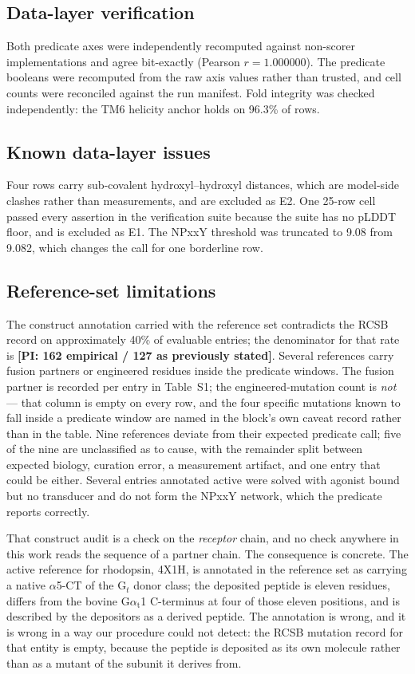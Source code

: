 \subsection*{Data-layer verification}

Both predicate axes were independently recomputed against non-scorer
implementations and agree bit-exactly (Pearson $r = 1.000000$). The predicate
booleans were recomputed from the raw axis values rather than trusted, and cell
counts were reconciled against the run manifest. Fold integrity was checked
independently: the TM6 helicity anchor holds on 96.3\% of rows.

\subsection*{Known data-layer issues}

Four rows carry sub-covalent hydroxyl--hydroxyl distances, which are model-side
clashes rather than measurements, and are excluded as E2. One 25-row cell passed
every assertion in the verification suite because the suite has no pLDDT floor,
and is excluded as E1. The NPxxY threshold was truncated to 9.08 from 9.082,
which changes the call for one borderline row.

\subsection*{Reference-set limitations}

The construct annotation carried with the reference set contradicts the RCSB
record on approximately 40\% of evaluable entries; the denominator for that rate
is \textbf{[PI: 162 empirical / 127 as previously stated]}. Several references
carry fusion partners or engineered residues inside the predicate windows. The
fusion partner is recorded per entry in Table~S1; the engineered-mutation count
is \emph{not} --- that column is empty on every row, and the four specific
mutations known to fall inside a predicate window are named in the block's own
caveat record rather than in the table. Nine references deviate from their expected
predicate call; five of the nine are unclassified as to cause, with the
remainder split between expected biology, curation error, a measurement
artifact, and one entry that could be either. Several entries annotated active
were solved with agonist bound but no transducer and do not form the NPxxY
network, which the predicate reports correctly.

That construct audit is a check on the \emph{receptor} chain, and no check
anywhere in this work reads the sequence of a partner chain. The consequence is
concrete. The active reference for rhodopsin, 4X1H, is annotated in the
reference set as carrying a native $\alpha$5-CT of the G$_t$ donor class; the
deposited peptide is eleven residues, differs from the bovine
G$\alpha_{\mathrm{t}}$1 C-terminus at four of those eleven positions, and is
described by the depositors as a derived peptide. The annotation is wrong, and
it is wrong in a way our procedure could not detect: the RCSB mutation record
for that entity is empty, because the peptide is deposited as its own molecule
rather than as a mutant of the subunit it derives from.

